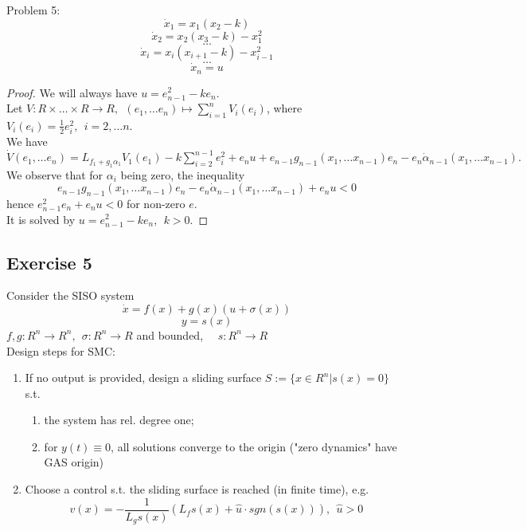     Problem 5:
    $$\dot x_1 = x_1(x_2-k)$$
    $$\dot x_2 = x_2(x_3-k)-x_1^2$$
    $$\dots$$
    $$\dot x_i = x_i(x_{i+1}-k)-x_{i-1}^2$$
    $$\dots$$
    $$\dot x_n = u$$
    \begin{proof}
        We will always have $u = e_{n-1}^2-ke_n$. \\
        Let $V: R \times \dots \times R \rightarrow R, \ \ (e_1, \dots e_n) \mapsto \sum_{i=1}^n V_i(e_i)$, where $V_i(e_i) = \frac{1}{2}e_i^2, \ \ i=2, \dots n$.\\
        We have $\dot V(e_1, \dots e_n) = L_{f_1+g_1\alpha_1}V_1(e_1)-k\sum_{i=2}^{n-1}e_i^2 + e_nu + e_{n-1}g_{n-1}(x_1, \dots x_{n-1})e_n - e_n \dot \alpha_{n-1}(x_1, \dots x_{n-1}).$\\
        We observe that for $\alpha_i$ being zero, the inequality
        $$e_{n-1}g_{n-1}(x_1, \dots x_{n-1})e_n - e_n \dot \alpha_{n-1} (x_1, \dots x_{n-1}) + e_nu < 0$$
        hence $e_{n-1}^2e_n + e_nu < 0$ for non-zero $e$.\\
        It is solved by $u = e_{n-1}^2 - ke_n, \ \ k>0$.
    \end{proof}
    
    \subsection{Exercise 5}
    
    Consider the SISO system
    $$\dot x = f(x)+g(x)(u+\sigma(x))$$
    $$y=s(x)$$
    $f,g: R^n \rightarrow R^n, \ \ \sigma: R^n \rightarrow R$ and bounded, \ \ $s: R^n \rightarrow R$\\
    
    Design steps for SMC:\\
    \begin{enumerate}
        \item If no output is provided, design a sliding surface $S:=\{x \in R^n|s(x)=0\}$ s.t.
        \begin{enumerate}[label=(\alph*)]
            \item the system has rel. degree one;
            \item for $y(t) \equiv 0$, all solutions converge to the origin ("zero dynamics" have GAS origin)
        \end{enumerate}
        \item Choose a control s.t. the sliding surface is reached (in finite time), e.g. \\
        $$v(x) = - \frac{1}{L_gs(x)}(L_fs(x)+ \hat u \cdot sgn(s(x))), \ \ \hat u > 0$$
    \end{enumerate}
    

